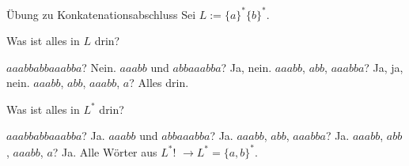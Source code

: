 \begin{frame}{Übung zu Konkatenationsabschluss}
	\pause Sei $L := \{a\}^*\{b\}^*$.
	\begin{itemize}
		\pitem Was ist alles in $L$ drin?
		\begin{itemize}
			\pitem $aaabbabbaaabba$? \pause Nein.
			\pitem $aaabb$ und $abbaaabba$? \pause Ja, nein.
			\pitem $aaabb$, $abb$, $aaabba$? \pause Ja, ja, nein.
			\pitem $aaabb$, $abb$, $aaabb$, $a$? \pause Alles drin.
		\end{itemize}
		\pitem Was ist alles in $L^*$ drin?
		\begin{itemize}
			\pitem $aaabbabbaaabba$? \pause Ja.
			\pitem $aaabb$ und $abbaaabba$? \pause Ja.
			\pitem $aaabb$, $abb$, $aaabba$? \pause Ja.
			\pitem $aaabb$, $abb$, $aaabb$, $a$? \pause Ja.
			\pitem Alle Wörter aus $L^*$! \pause $\rightarrow L^* = \{a,b\}^*$.
		\end{itemize}
	\end{itemize}
\end{frame}

